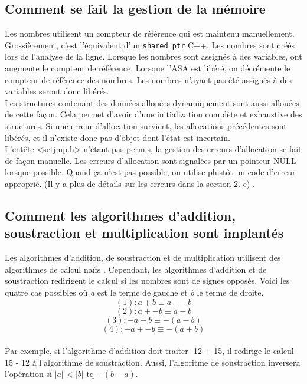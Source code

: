 \documentclass[a4paper,12pt,french]{article}
\begin{document}
	\subsection{Comment se fait la gestion de la mémoire}
		Les nombres utilisent un compteur de référence qui est maintenu manuellement. Grossièrement,
		c'est l'équivalent d'un \lstinline$shared_ptr$ C++. Les nombres sont créés lors de l'analyse de la
		ligne. Lorsque les nombres sont assignés à des variables, ont augmente le compteur de
		référence. Lorsque l'ASA est libéré, on décrémente le compteur de référence des nombres.
		Les nombres n'ayant pas été assignés à des variables seront donc libérés.\\

		Les structures contenant des données allouées dynamiquement sont aussi allouées de cette
		façon. Cela permet d'avoir d'une initialization complète et exhaustive des structures.
		Si une erreur d'allocation survient, les allocations précédentes sont libérés, et il
		n'existe donc pas d'objet dont l'état est incertain.\\

		L'entête <setjmp.h> n'étant pas permis, la gestion des erreurs d'allocation se fait de
		façon manuelle. Les erreurs d'allocation sont signalées par un pointeur NULL lorsque
		possible. Quand ça n'est pas possible, on utilise plustôt un code d'erreur approprié.
		(Il y a plus de détails sur les erreurs dans la section 2. e) .\\
	\subsection{Comment les algorithmes d’addition, soustraction et multiplication sont implantés}
		Les algorithmes d'addition, de soustraction et de multiplication utilisent des algorithmes de calcul \og naïfs \fg{}.
		Cependant, les algorithmes d'addition et de soustraction redirigent le calcul si les nombres sont de signes opposés. Voici les quatre cas possibles où \textit{a} est le terme de gauche et \textit{b} le terme de droite.
		\[ (1) : a + b \equiv a - -b\]
		\[ (2) : a + -b \equiv a - b  \]
		\[ (3) : -a + b \equiv -(a-b) \]
		\[ (4) : -a + -b \equiv -(a+b) \]
		\\Par exemple, si l'algorithme d'addition doit traiter -12 + 15, il redirige le calcul 15 - 12 à l'algorithme de soustraction. Aussi, l'algoritme de soustraction inversera l'opération si $|a|$ < $|b|$ tq $-(b-a)$.\\
\end{document}
